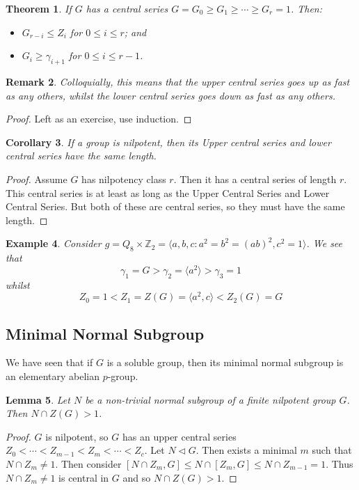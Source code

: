 \documentclass[a4paper,10pt]{article}
\newcommand{\ZZ}{\mathbb{Z}}
\newtheorem{thm}{Theorem}
\newtheorem{Cor}[thm]{Corollary}
\newtheorem{eg}[thm]{Example}
\newtheorem{Lem}[thm]{Lemma}
\newtheorem{rem}[thm]{Remark}
\begin{document}
\begin{thm}
If $G$ has a central series $G = G_0 \geq G_1 \geq \cdots \geq G_r = 1$. Then:
\begin{itemize}
\item $G_{r - i} \leq Z_i$ for $0 \leq i \leq r$; and
\item $G_i \geq \gamma_{i + 1}$ for $0 \leq i \leq r-1$. 
\end{itemize}
\end{thm}
\begin{rem}
Colloquially, this means that the upper central series goes up as fast as any others, whilst the lower central series goes down as fast as any others. 
\end{rem}
\begin{proof}
Left as an exercise, use induction.
\end{proof}


\begin{Cor}
If a group is nilpotent, then its Upper central series and lower central series have the same length. 
\end{Cor}

\begin{proof}
Assume $G$ has nilpotency class $r$. Then it has a central series of length $r$. This central series is at least as long as the Upper Central Series and Lower Central Series. But both of these are central series, so they must have the same length. 
\end{proof}


\begin{eg}
Consider $g = Q_8 \times \ZZ_2 = \langle a,b,c : a^2 = b^2 = (ab)^2, c^2 = 1 \rangle$. We see that
\[ \gamma_1 = G > \gamma_2 = \langle a^2 \rangle > \gamma_3 = 1 \]
whilst 
\[ Z_0 = 1 < Z_1 = Z(G) = \langle a^2, c \rangle < Z_2(G) = G \]
\end{eg}


\subsection{Minimal Normal Subgroup}

We have seen that if $G$ is a soluble group, then its minimal normal subgroup is an elementary abelian $p$-group. 

\begin{Lem}
Let $N$ be a non-trivial normal subgroup of a finite nilpotent group $G$. Then $N \cap Z(G) > 1$. 
\end{Lem}

\begin{proof}
$G$ is nilpotent, so $G$ has an upper central series $Z_0 < \cdots < Z_{m-1} < Z_m < \cdots < Z_c$. Let $N \triangleleft G$. Then exists a minimal $m$ such that $N \cap Z_m \neq 1$. Then consider $[N \cap Z_m, G] \leq N \cap [Z_m, G] \leq N \cap Z_{m-1} = 1$. Thus $N \cap Z_m \neq 1$ is central in $G$ and so $N \cap Z(G) > 1$.  
\end{proof}
\end{document}
